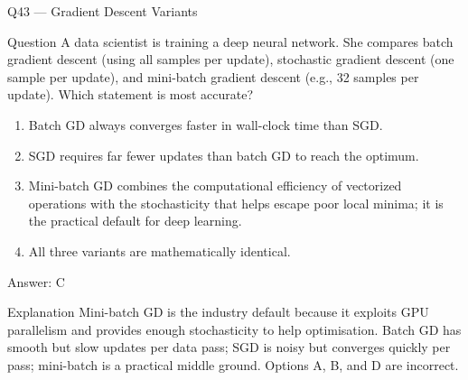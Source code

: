 \documentclass[aspectratio=169,8pt]{beamer}
\begin{document}
	
	\begin{frame}{Q43 --- Gradient Descent Variants}
		\begin{block}{Question}
			A data scientist is training a deep neural network. She compares batch gradient descent (using all samples per update), stochastic gradient descent (one sample per update), and mini-batch gradient descent (e.g., 32 samples per update). Which statement is most accurate?
		\end{block}
		\begin{enumerate}
			\item Batch GD always converges faster in wall-clock time than SGD.
			\item SGD requires far fewer updates than batch GD to reach the optimum.
			\item Mini-batch GD combines the computational efficiency of vectorized operations with the stochasticity that helps escape poor local minima; it is the practical default for deep learning.
			\item All three variants are mathematically identical.
		\end{enumerate}
		\begin{exampleblock}{Answer: C}\end{exampleblock}
		\begin{block}{Explanation}
			Mini-batch GD is the industry default because it exploits GPU parallelism and provides enough stochasticity to help optimisation. Batch GD has smooth but slow updates per data pass; SGD is noisy but converges quickly per pass; mini-batch is a practical middle ground. Options A, B, and D are incorrect.
		\end{block}
	\end{frame}
	
\end{document}
